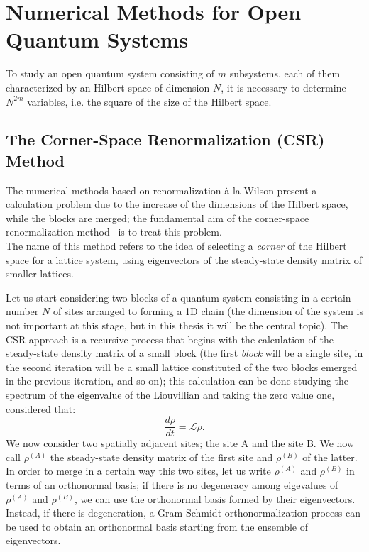 \chapter{Numerical Methods for Open Quantum Systems}
To study an open quantum system consisting of $m$ subsystems, each of them characterized by an Hilbert space of dimension $N$, it is necessary to determine $N^{2m}$ variables, i.e. the square of the size of the Hilbert space. 

\section{The Corner-Space Renormalization (CSR) Method}
The numerical methods based on renormalization à la Wilson present a calculation problem due to the increase of the dimensions of the Hilbert space, while the blocks are merged; the fundamental aim of the corner-space renormalization method~\cite{PhysRevLett.115.080604} is to treat this problem. \\
The name of this method refers to the idea of selecting a \emph{corner} of the Hilbert space for a lattice system, using eigenvectors of the steady-state density matrix of smaller lattices.

Let us start considering two blocks of a quantum system consisting in a certain number $N$ of sites arranged to forming a 1D chain (the dimension of the system is not important at this stage, but in this thesis it will be the central topic). The CSR approach is a recursive process that begins with the calculation of the steady-state density matrix of a small block (the first \emph{block} will be a single site, in the second iteration will be a small lattice constituted of the two blocks emerged in the previous iteration, and so on); this calculation can be done studying the spectrum of the eigenvalue of the Liouvillian and taking the zero value one, considered that:
\begin{equation}
    \frac{d\rho}{dt} = \mathcal{L} \rho.
\end{equation}
We now consider two spatially adjacent sites; the site A and the site B. We now call $\rho^{(A)}$ the steady-state density matrix of the first site and $\rho^{(B)}$ of the latter. In order to merge in a certain way this two sites, let us write $\rho^{(A)}$ and $\rho^{(B)}$ in terms of an orthonormal basis; if there is no degeneracy among eigevalues of $\rho^{(A)}$ and $\rho^{(B)}$, we can use the orthonormal basis formed by their eigenvectors. Instead, if there is degeneration, a Gram-Schmidt orthonormalization process can be used to obtain an orthonormal basis starting from the ensemble of eigenvectors.

